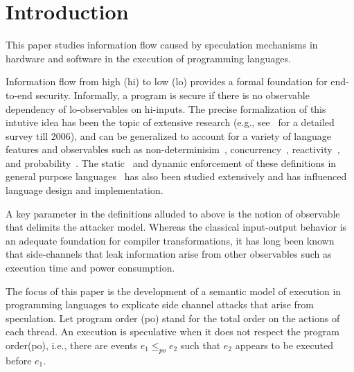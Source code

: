 \section{Introduction}

This paper studies information flow caused by speculation mechanisms
in hardware and software in the execution of programming languages.

Information flow from high (hi) to low (lo) provides a formal
foundation for end-to-end security.  Informally, a program is secure
if there is no observable dependency of lo-observables on hi-inputs.
The precise formalization of this intutive idea has been the topic of
extensive research (e.g., see~\cite{???}  for a detailed survey till
2006), and can be generalized to account for a variety of language
features and observables such as non-determinisim~\cite{???},
concurrency~\cite{???}, reactivity~\cite{???}, and
probability~\cite{???}. The static~\cite{???} and dynamic enforcement
of these definitions in general purpose languages~\cite{???} has also
been studied extensively and has influenced language design and
implementation.

A key parameter in the definitions alluded to above is the notion of
observable that delimits the attacker model. Whereas the classical
input-output behavior is an adequate foundation for compiler
transformations, it has long been known that side-channels that leak
information arise from other observables such as execution time and
power consumption.

The focus of this paper is the development of a semantic model of
execution in programming languages to explicate side channel attacks
that arise from speculation. Let program order (po) stand for the
total order on the actions of each thread. An execution is speculative
when it does not respect the program order(po), i.e., there are events
$e_1 \le_{po} e_2$ such that $e_2$ appears to be executed before $e_1$.

